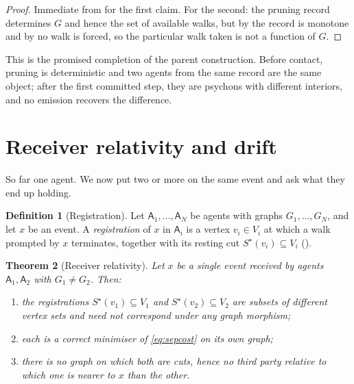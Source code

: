 \documentclass[11pt,a4paper]{article}
\theoremstyle{clstyle}
\newtheorem{theorem}{Theorem}[section]
\theoremstyle{definition}
\newtheorem{definition}[theorem]{Definition}
\theoremstyle{remark}
\newcommand{\Ag}{\mathsf{A}}
\newcommand{\term}{v}                    %
\begin{document}
\begin{proof}
Immediate from  for the first claim. For the second: the
pruning record determines $G$ and hence the set of available walks, but by
 the record is monotone and by  no
walk is forced, so the particular walk taken is not a function of $G$.
\end{proof}

This is the promised completion of the parent construction. Before contact,
pruning is deterministic and two agents from the same record are the same
object; after the first committed step, they are psychons with different
interiors, and no emission recovers the difference.

\section{Receiver relativity and drift}
\label{sec:receiver}

So far one agent. We now put two or more on the same event and ask what they
end up holding.

\begin{definition}[Registration]
\label{def:registration}
Let $\Ag_1,\dots,\Ag_N$ be agents with graphs $G_1,\dots,G_N$, and let $x$
be an event. A \emph{registration} of $x$ in $\Ag_i$ is a vertex
$\term_i\in V_i$ at which a walk prompted by $x$ terminates, together with
its resting cut $S^{\star}(\term_i)\subseteq V_i$ ().
\end{definition}

\begin{theorem}[Receiver relativity]
\label{thm:receiver}
Let $x$ be a single event received by agents $\Ag_1,\Ag_2$ with
$G_1\neq G_2$. Then:
\begin{enumerate}[label=(\roman*),leftmargin=2em]
\item the registrations $S^{\star}(\term_1)\subseteq V_1$ and
$S^{\star}(\term_2)\subseteq V_2$ are subsets of different vertex sets and
need not correspond under any graph morphism;
\item each is a correct minimiser of \eqref{eq:sepcost} on its own graph;
\item there is no graph on which both are cuts, hence no third party
relative to which one is nearer to $x$ than the other.
\end{enumerate}
\end{theorem}
\end{document}
